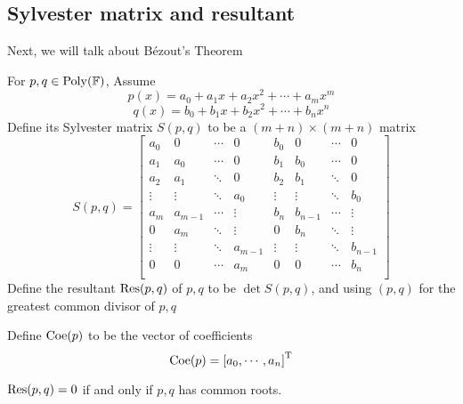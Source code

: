 \subsection{Sylvester matrix and resultant}

Next, we will talk about B\'ezout's Theorem

\begin{definition}\label{definition 19}
For $ p,q \in \operatorname{Poly}(\mathbb{F}) $, Assume
$$ p(x) = a_{0} + a_{1}x + a_{2}x^{2} + \cdots + a_{m}x^{m} $$
$$ q(x) = b_{0} + b_{1}x + b_{2}x^{2} + \cdots + b_{n}x^{n} $$
Define its Sylvester matrix $ S(p,q) $ to be a $ (m+n) \times (m+n) $ matrix
$$
S(p,q) = 
\left[
\begin{matrix}
 a_{0}  &     0     &  \cdots  &     0     &  b_{0}  &     0     &  \cdots  &     0       \\
 a_{1}  &   a_{0}   &  \cdots  &     0     &  b_{1}  &   b_{0}   &  \cdots  &     0       \\
 a_{2}  &   a_{1}   &  \ddots  &     0     &  b_{2}  &   b_{1}   &  \ddots  &     0       \\
\vdots  &  \vdots   &  \ddots  &   a_{0}   & \vdots  &  \vdots   &  \ddots  &   b_{0}     \\
 a_{m}  &  a_{m-1}  &  \cdots  &  \vdots   &  b_{n}  &  b_{n-1}  &  \cdots  &  \vdots     \\
  0     &   a_{m}   &  \ddots  &  \vdots   &   0     &   b_{n}   &  \ddots  &  \vdots     \\
\vdots  &  \vdots   &  \ddots  &  a_{m-1}  & \vdots  &  \vdots   &  \ddots  &  b_{n-1}    \\
  0     &     0     &  \cdots  &   a_{m}   &   0     &     0     &  \cdots  &   b_{n}     \\
\end{matrix}
\right]
$$
Define the resultant $ \operatorname{Res}(p,q) $ of $ p,q $ to be $ \det S(p,q) $, and using $ (p,q) $ for the greatest 
common divisor of $ p,q $ \par
Define $ \operatorname{Coe}(p) $ to be the vector of coefficients
$$ \operatorname{Coe}(p) = \left[ a_{0}, \cdots, a_{n} \right]^{\mathrm{T}} $$

\end{definition}

\begin{theorem}\label{theorem 20}
$ \operatorname{Res}(p,q) = 0 $ if and only if $ p,q $ has common roots.
\end{theorem}

